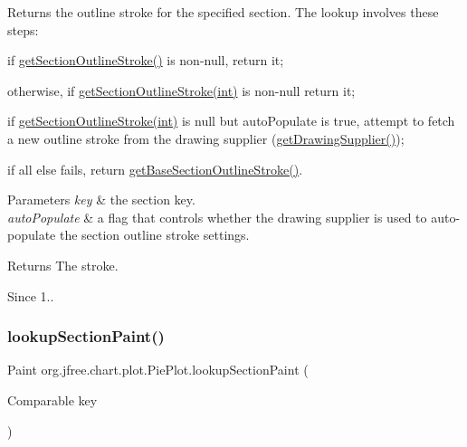 Returns the outline stroke for the specified section. The lookup involves these steps\+: 
\begin{DoxyItemize}
\item if \mbox{\hyperlink{classorg_1_1jfree_1_1chart_1_1plot_1_1_pie_plot_a60e2103a7ab26844fe2b655fc713128b}{get\+Section\+Outline\+Stroke()}} is non-\/{\ttfamily null}, return it; 
\item otherwise, if \mbox{\hyperlink{classorg_1_1jfree_1_1chart_1_1plot_1_1_pie_plot_a334be36253108e12b90a70e0ab4066be}{get\+Section\+Outline\+Stroke(int)}} is non-\/{\ttfamily null} return it; 
\item if \mbox{\hyperlink{classorg_1_1jfree_1_1chart_1_1plot_1_1_pie_plot_a334be36253108e12b90a70e0ab4066be}{get\+Section\+Outline\+Stroke(int)}} is {\ttfamily null} but {\ttfamily auto\+Populate} is {\ttfamily true}, attempt to fetch a new outline stroke from the drawing supplier (\mbox{\hyperlink{classorg_1_1jfree_1_1chart_1_1plot_1_1_plot_a371e21293523674a59d87c9d62ffff15}{get\+Drawing\+Supplier()}}); 
\item if all else fails, return \mbox{\hyperlink{classorg_1_1jfree_1_1chart_1_1plot_1_1_pie_plot_a30e131b03d74d18e60d06e69f4219df0}{get\+Base\+Section\+Outline\+Stroke()}}. 
\end{DoxyItemize}


\begin{DoxyParams}{Parameters}
{\em key} & the section key. \\
\hline
{\em auto\+Populate} & a flag that controls whether the drawing supplier is used to auto-\/populate the section outline stroke settings.\\
\hline
\end{DoxyParams}
\begin{DoxyReturn}{Returns}
The stroke.
\end{DoxyReturn}
\begin{DoxySince}{Since}
1.. 
\end{DoxySince}
\mbox{\label{classorg_1_1jfree_1_1chart_1_1plot_1_1_pie_plot_a4b18bc37829ff565c72d2bdd1acd0bb7}} 
\subsubsection{\texorpdfstring{lookup\+Section\+Paint()}{lookupSectionPaint()}\hspace{0.1cm}{\footnotesize\ttfamily [1/3]}}
{\footnotesize\ttfamily Paint org.\+jfree.\+chart.\+plot.\+Pie\+Plot.\+lookup\+Section\+Paint (\begin{DoxyParamCaption}\item[{Comparable}]{key }\end{DoxyParamCaption})\hspace{0.3cm}{\ttfamily [protected]}}

